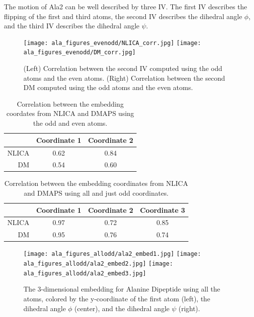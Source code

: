 \documentclass[12pt]{article}
\begin{document}
The motion of Ala2 can be well described by three IV.
%
The first IV describes the flipping of the first and third atoms, the second IV describes the dihedral angle $\phi$, and the third IV describes the dihedral angle $\psi$.

\begin{figure}[H]
    \texttt{[image: ala\_figures\_evenodd/NLICA\_corr.jpg]}
    \texttt{[image: ala\_figures\_evenodd/DM\_corr.jpg]}
    \caption{(Left) Correlation between the second IV computed using the odd atoms and the even atoms. (Right) Correlation between the second DM computed using the odd atoms and the even atoms.}
\end{figure}

\begin{table}
\begin{tabular}{| r || c | c |}
  \hline
  & Coordinate 1 & Coordinate 2 \\
  \hline
  \hline
  NLICA & 0.62 & 0.84 \\
  \hline
  DM & 0.54 & 0.60 \\
  \hline
\end{tabular}
\caption{Correlation between the embedding coordates from NLICA and DMAPS using the odd and even atoms.}
\end{table}

\begin{table}
\begin{tabular}{| r || c | c | c |}
  \hline
  & Coordinate 1 & Coordinate 2 & Coordinate 3 \\
  \hline
  \hline
  NLICA & 0.97 & 0.72 & 0.85 \\
  \hline
  DM & 0.95 & 0.76 & 0.74 \\
  \hline
\end{tabular}
\caption{Correlation between the embedding coordinates from NLICA and DMAPS using all and just odd coordinates.}
\end{table}


\begin{figure}[H]
    \texttt{[image: ala\_figures\_allodd/ala2\_embed1.jpg]}
    \texttt{[image: ala\_figures\_allodd/ala2\_embed2.jpg]}
    \texttt{[image: ala\_figures\_allodd/ala2\_embed3.jpg]}
    \caption{The 3-dimensional embedding for Alanine Dipeptide using all the atoms, colored by the y-coordinate of the first atom (left), the dihedral angle $\phi$ (center), and the dihedral angle $\psi$ (right).}
\end{figure}
\end{document}
